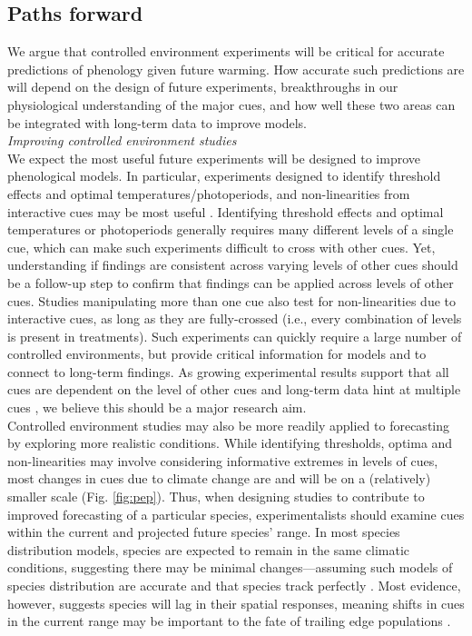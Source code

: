 \documentclass[11pt,letter]{article}
\begin{document}
\subsection{Paths forward} 
We argue that controlled environment experiments will be critical for accurate predictions of phenology given future warming. How accurate such predictions are will depend on the design of future experiments, breakthroughs in our physiological understanding of the major cues, and how well these two areas can be integrated with long-term data to improve models. \\

\emph{Improving controlled environment studies}\\
We expect the most useful future experiments will be designed to improve phenological models. In particular, experiments designed to identify threshold effects and optimal temperatures/photoperiods, and non-linearities from interactive cues may be most useful \citep{iler2013}. Identifying threshold effects and optimal temperatures or photoperiods generally requires many different levels of a single cue, which can make such experiments difficult to cross with other cues. Yet, understanding if findings are consistent across varying levels of other cues should be a follow-up step to confirm that findings can be applied across levels of other cues. Studies manipulating more than one cue also test for non-linearities due to interactive cues, as long as they are fully-crossed (i.e., every combination of levels is present in treatments). Such experiments can quickly require a large number of controlled environments, but provide critical information for models and to connect to long-term findings. As growing experimental results support that all cues are dependent on the level of other cues \citep{stearns1958,flynn2018} and long-term data hint at multiple cues \citep{fu2015}, we believe this should be a major research aim.\\

Controlled environment studies may also be more readily applied to forecasting by exploring more realistic conditions. While identifying thresholds, optima and non-linearities may involve considering informative extremes in levels of cues, most changes in cues due to climate change are and will be on a (relatively) smaller scale (Fig. \ref{fig:pep}). Thus, when designing studies to contribute to improved forecasting of a particular species, experimentalists should examine cues within the current and projected future species' range. In most species distribution models, species are expected to remain in the same climatic conditions, suggesting there may be minimal changes---assuming such models of species distribution are accurate and that species track perfectly \citep{elith2009species}. Most evidence, however, suggests species will lag in their spatial responses, meaning shifts in cues in the current range may be important to the fate of trailing edge populations \citep{bertrand2011changes,lenoir2015climate,savage2015elevational}. \\ %
\end{document}
